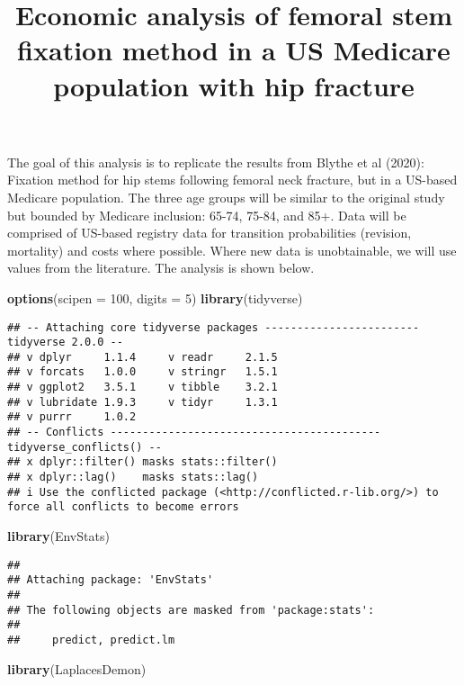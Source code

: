 \documentclass[
]{article}
\title{Economic analysis of femoral stem fixation method in a US
Medicare population with hip fracture}
\author{}
\date{\vspace{-2.5em}}
\newenvironment{Shaded}{\begin{snugshade}}{\end{snugshade}}
\newcommand{\AttributeTok}[1]{\textcolor[rgb]{0.13,0.29,0.53}{#1}}
\newcommand{\DecValTok}[1]{\textcolor[rgb]{0.00,0.00,0.81}{#1}}
\newcommand{\FunctionTok}[1]{\textcolor[rgb]{0.13,0.29,0.53}{\textbf{#1}}}
\newcommand{\NormalTok}[1]{#1}
\begin{document}
\maketitle

The goal of this analysis is to replicate the results from Blythe et al
(2020): Fixation method for hip stems following femoral neck fracture,
but in a US-based Medicare population. The three age groups will be
similar to the original study but bounded by Medicare inclusion: 65-74,
75-84, and 85+. Data will be comprised of US-based registry data for
transition probabilities (revision, mortality) and costs where possible.
Where new data is unobtainable, we will use values from the literature.
The analysis is shown below.

\begin{Shaded}
\begin{Highlighting}[]
\FunctionTok{options}\NormalTok{(}\AttributeTok{scipen =} \DecValTok{100}\NormalTok{, }\AttributeTok{digits =} \DecValTok{5}\NormalTok{)}
\FunctionTok{library}\NormalTok{(tidyverse)}
\end{Highlighting}
\end{Shaded}

\begin{verbatim}
## -- Attaching core tidyverse packages ------------------------ tidyverse 2.0.0 --
## v dplyr     1.1.4     v readr     2.1.5
## v forcats   1.0.0     v stringr   1.5.1
## v ggplot2   3.5.1     v tibble    3.2.1
## v lubridate 1.9.3     v tidyr     1.3.1
## v purrr     1.0.2     
## -- Conflicts ------------------------------------------ tidyverse_conflicts() --
## x dplyr::filter() masks stats::filter()
## x dplyr::lag()    masks stats::lag()
## i Use the conflicted package (<http://conflicted.r-lib.org/>) to force all conflicts to become errors
\end{verbatim}

\begin{Shaded}
\begin{Highlighting}[]
\FunctionTok{library}\NormalTok{(EnvStats)}
\end{Highlighting}
\end{Shaded}

\begin{verbatim}
## 
## Attaching package: 'EnvStats'
## 
## The following objects are masked from 'package:stats':
## 
##     predict, predict.lm
\end{verbatim}

\begin{Shaded}
\begin{Highlighting}[]
\FunctionTok{library}\NormalTok{(LaplacesDemon)}
\end{Highlighting}
\end{Shaded}
\end{document}
